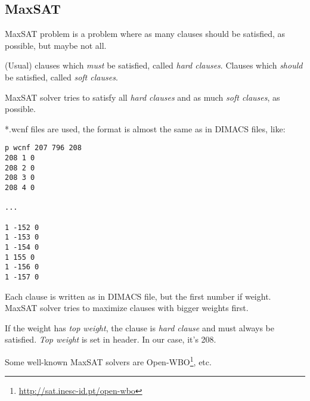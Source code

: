 \subsection{MaxSAT}

MaxSAT problem is a problem where as many clauses should be satisfied, as possible, but maybe not all.

(Usual) clauses which \textit{must} be satisfied, called \textit{hard clauses}.
Clauses which \textit{should} be satisfied, called \textit{soft clauses}.

MaxSAT solver tries to satisfy all \textit{hard clauses} and as much \textit{soft clauses}, as possible.

*.wcnf files are used, the format is almost the same as in DIMACS files, like:

\begin{lstlisting}
p wcnf 207 796 208
208 1 0
208 2 0
208 3 0
208 4 0

...

1 -152 0
1 -153 0
1 -154 0
1 155 0
1 -156 0
1 -157 0
\end{lstlisting}

Each clause is written as in DIMACS file, but the first number if weight.
MaxSAT solver tries to maximize clauses with bigger weights first.

If the weight has \textit{top weight}, the clause is \textit{hard clause} and must always be satisfied.
\textit{Top weight} is set in header.
In our case, it's 208.

Some well-known MaxSAT solvers are Open-WBO\footnote{\url{http://sat.inesc-id.pt/open-wbo}}, etc.

